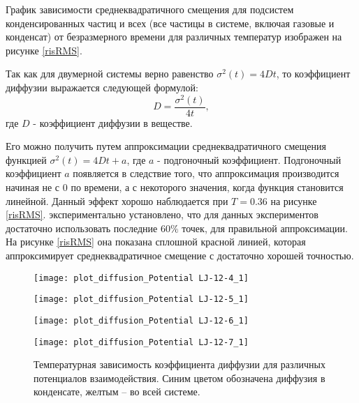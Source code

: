 График зависимости среднеквадратичного смещения для подсистем конденсированных частиц и всех (все частицы в системе, включая газовые и конденсат) от безразмерного времени для различных температур изображен на рисунке \ref{risRMS}.

Так как для двумерной системы верно равенство $\sigma^2(t) = 4Dt$, то коэффициент диффузии выражается следующей формулой:
\begin{equation}
    D = \frac{\sigma^2(t)}{4t},
    \label{eqD}
\end{equation}
где $D$ - коэффициент диффузии в веществе.

Его можно получить путем аппроксимации среднеквадратичного смещения функцией $\sigma^2(t) = 4Dt + a$, где $a$ - подгоночный коэффициент. Подгоночный коэффициент $a$ появляется в следствие того, что аппроксимация производится начиная не с 0 по времени, а с некоторого значения, когда функция становится линейной. Данный эффект хорошо наблюдается при $T = 0.36$ на рисунке \ref{risRMS}. экспериментально установлено, что для данных экспериментов достаточно использовать последние $60\%$ точек, для правильной аппроксимации. 
На рисунке \ref{risRMS} она показана сплошной красной линией, которая аппроксимирует среднеквадратичное смещение с достаточно хорошей точностью.

\begin{figure}[h]
\begin{center}
\begin{minipage}[h]{0.45\linewidth}
\texttt{[image: plot\_diffusion\_Potential LJ-12-4\_1]}
\end{minipage}
\begin{minipage}[h]{0.45\linewidth}
\texttt{[image: plot\_diffusion\_Potential LJ-12-5\_1]}
\end{minipage}
\begin{minipage}[h]{0.45\linewidth}
\texttt{[image: plot\_diffusion\_Potential LJ-12-6\_1]}
\end{minipage}
\begin{minipage}[h]{0.45\linewidth}
\texttt{[image: plot\_diffusion\_Potential LJ-12-7\_1]}
\end{minipage}
\caption{Температурная зависимость коэффициента диффузии для различных потенциалов взаимодействия. Синим цветом обозначена диффузия в конденсате, желтым -- во всей системе.}
\label{risD}
\end{center}
\end{figure}

